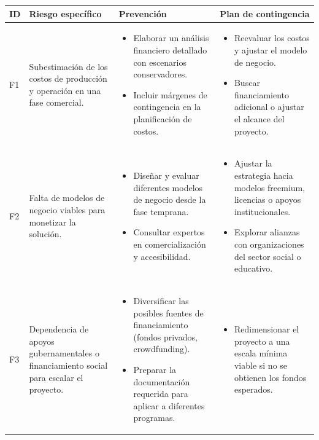 \begin{longtable}{|>{\centering\arraybackslash}p{0.8cm}|>{\raggedright\arraybackslash}p{3.5cm}|>{\raggedright\arraybackslash}p{5.1cm}|>{\raggedright\arraybackslash}p{5.1cm}|}
	\hline
	\textbf{ID} & \textbf{Riesgo específico} & \textbf{Prevención} & \textbf{Plan de contingencia} \\
	\hline
	F1 & Subestimación de los costos de producción y operación en una fase comercial. &
	\begin{itemize}
		\item Elaborar un análisis financiero detallado con escenarios conservadores.
		\item Incluir márgenes de contingencia en la planificación de costos.
	\end{itemize} &
	\begin{itemize}
		\item Reevaluar los costos y ajustar el modelo de negocio.
		\item Buscar financiamiento adicional o ajustar el alcance del proyecto.
	\end{itemize} \\
	\hline
	F2 & Falta de modelos de negocio viables para monetizar la solución. &
	\begin{itemize}
		\item Diseñar y evaluar diferentes modelos de negocio desde la fase temprana.
		\item Consultar expertos en comercialización y accesibilidad.
	\end{itemize} &
	\begin{itemize}
		\item Ajustar la estrategia hacia modelos freemium, licencias o apoyos institucionales.
		\item Explorar alianzas con organizaciones del sector social o educativo.
	\end{itemize} \\
	\hline
	F3 & Dependencia de apoyos gubernamentales o financiamiento social para escalar el proyecto. &
	\begin{itemize}
		\item Diversificar las posibles fuentes de financiamiento (fondos privados, crowdfunding).
		\item Preparar la documentación requerida para aplicar a diferentes programas.
	\end{itemize} &
	\begin{itemize}
		\item Redimensionar el proyecto a una escala mínima viable si no se obtienen los fondos esperados.

\end{itemize}
\end{longtable}
